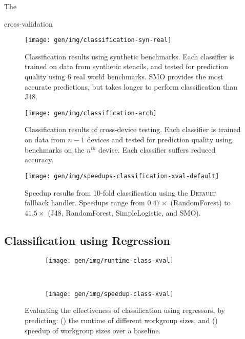 The

cross-validation



\begin{figure}
\centering
\texttt{[image: gen/img/classification-syn-real]}
\caption{%
  Classification results using synthetic benchmarks. Each classifier
  is trained on data from synthetic stencils, and tested for
  prediction quality using 6 real world benchmarks. SMO provides the
  most accurate predictions, but takes longer to perform
  classification than J48.%
}
\end{figure}

\begin{figure}
\centering
\texttt{[image: gen/img/classification-arch]}
\caption{%
  Classification results of cross-device testing. Each classifier is
  trained on data from $n-1$ devices and tested for prediction quality
  using benchmarks on the $n^{th}$ device. Each classifier suffers
  reduced accuracy.%
}
\end{figure}

\begin{figure}
\centering
\texttt{[image: gen/img/speedups-classification-xval-default]}
\caption{%
  Speedup results from 10-fold classification using the
  \textsc{Default} fallback handler. Speedups range from $0.47\times$
  (RandomForest) to $41.5\times$ (J48, RandomForest, SimpleLogistic,
  and SMO).%
}
\end{figure}

\subsection{Classification using Regression}

\begin{figure}
\centering
\begin{subfigure}[h]{.45\textwidth}
\centering
\texttt{[image: gen/img/runtime-class-xval]}
\caption{}
\label{fig:runtime-class-xval}
\end{subfigure}
~%
\begin{subfigure}[h]{.45\textwidth}
\centering
\texttt{[image: gen/img/speedup-class-xval]}
\caption{}
\label{fig:speedup-class-xval}
\end{subfigure}
\caption{%
  Evaluating the effectiveness of classification using regressors, by
  predicting: () the runtime of
  different workgroup sizes, and ()
  speedup of workgroup sizes over a baseline.%
}
\label{fig:regression-class}
\end{figure}

